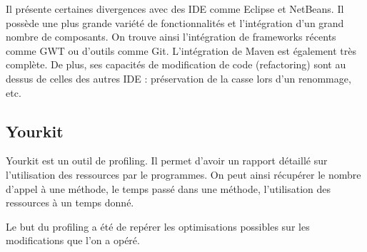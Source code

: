 Il présente certaines divergences avec des IDE comme Eclipse et NetBeans.
Il possède une plus grande variété de fonctionnalités et l'intégration d'un grand nombre de composants.
On trouve ainsi l'intégration de frameworks récents comme GWT ou d'outils comme Git.
L'intégration de Maven est également très complète.
De plus, ses capacités de modification de code (refactoring) sont au dessus de celles des autres IDE : préservation de la casse lors d'un renommage, etc.
\subsection{Yourkit}
Yourkit est un outil de profiling. Il permet d'avoir un rapport détaillé sur l'utilisation des ressources par le programmes. On peut ainsi récupérer le nombre d'appel à une méthode, le temps passé dans une méthode, l'utilisation des ressources à un temps donné.

Le but du profiling a été de repérer les optimisations possibles sur les modifications que l'on a opéré.